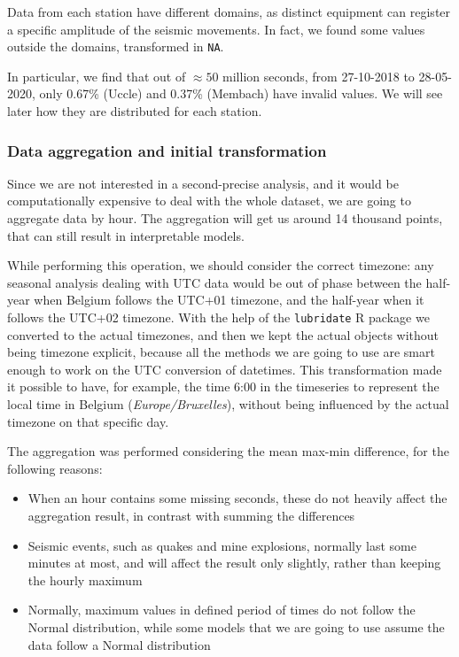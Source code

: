\documentclass[12pt]{article}
\begin{document}
Data from each station have different domains, as distinct equipment can register a specific amplitude of the seismic movements. In fact, we found some values outside the domains, transformed in \texttt{NA}.

In particular, we find that out of $\approx50$ million seconds, from 27-10-2018 to 28-05-2020, only 0.67\% (Uccle) and 0.37\% (Membach) have invalid values. We will see later how they are distributed for each station.



\subsubsection{Data aggregation and initial transformation}
Since we are not interested in a second-precise analysis, and it would be computationally expensive to deal with the whole dataset, we are going to aggregate data by hour. The aggregation will get us around 14 thousand points, that can still result in interpretable models.

While performing this operation, we should consider the correct timezone: any seasonal analysis dealing with UTC data would be out of phase between the half-year when Belgium follows the UTC+01 timezone, and the half-year when it follows the UTC+02 timezone. With the help of the \texttt{lubridate} R package we converted to the actual timezones, and then we kept the actual objects without being timezone explicit, because all the methods we are going to use are smart enough to work on the UTC conversion of datetimes. This transformation made it possible to have, for example, the time 6:00 in the timeseries to represent the local time in Belgium (\textit{Europe/Bruxelles}), without being influenced by the actual timezone on that specific day.

The aggregation was performed considering the mean max-min difference, for the following reasons:
\begin{itemize}[topsep=0.5em,itemsep=0em,partopsep=0.5em]
	\item When an hour contains some missing seconds, these do not heavily affect the aggregation result, in contrast with summing the differences
	\item Seismic events, such as quakes and mine explosions, normally last some minutes at most, and will affect the result only slightly, rather than keeping the hourly maximum
	\item Normally, maximum values in defined period of times do not follow the Normal distribution, while some models that we are going to use assume the data follow a Normal distribution
\end{itemize}
\end{document}
